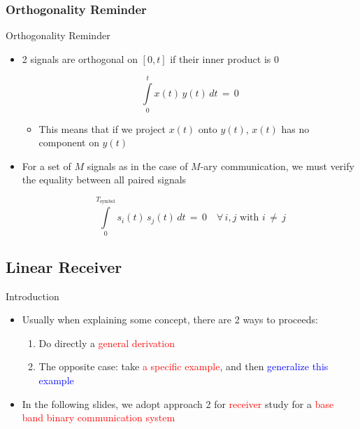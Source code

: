 \documentclass{Beamer}
\begin{document}
\subsubsection{Orthogonality Reminder}
\begin{frame}[t,allowframebreaks]{Orthogonality Reminder}

\begin{itemize}

\item 2 signals are orthogonal on $[0,t]$ if their inner product is 0

\begin{equation}
\displaystyle\int\limits_0^t x(t) \, y(t) \, dt \, = \, 0
\end{equation}

	\begin{itemize}
	\item This means that if we project $x(t)$ onto $y(t)$, $x(t)$ has no component on $y(t)$
	\end{itemize}

\item For a set of $M$ signals as in the case of $M$-ary communication, we must verify the equality between all paired signals

\begin{equation}
\displaystyle\int\limits_0^{T_{\text{symbol}}} s_i(t) \, s_j(t) \, dt \, = \, 0 \quad \forall \, i,j \text{ with } i \, \neq \, j
\end{equation}

\end{itemize}


\end{frame}



\subsection{Linear Receiver}

\begin{frame}[t]{Introduction}

\begin{itemize}

\item Usually when explaining some concept, there are 2 ways to proceeds:

	\begin{enumerate}
	\item Do directly a \textcolor{red}{general derivation}
	
	\item The opposite case: take \textcolor{red}{a specific example}, and then \textcolor{blue}{generalize this example}
	\end{enumerate}

\item In the following slides, we adopt approach 2 for \textcolor{red}{receiver} study for a \textcolor{red}{base band binary communication system} 

\end{itemize}

\end{frame}
\end{document}
